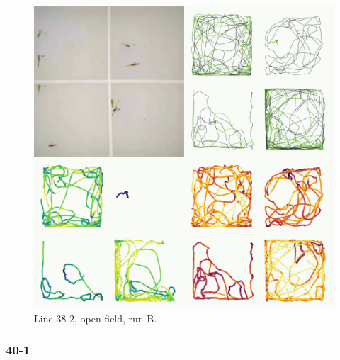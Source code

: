 \documentclass[
]{book}
\begin{document}
\begin{figure}
\includegraphics[width=1\linewidth]{figs/mikk_behaviour/four_panel_plots/open_field_20191116_1309_21-2_R_B_300} \caption{Line 38-2, open field, run B.}\label{fig:4p-21-2-of-B}
\end{figure}

\hypertarget{section-6}{%
\subsubsection{40-1}\label{section-6}}
\end{document}
